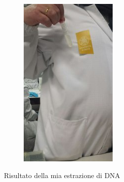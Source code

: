 \documentclass[twocolumn,a4paper,10pt]{my_report}
\begin{document}
\begin{figure}[htbp]
\begin{subfigure}{0.5\linewidth}
\includegraphics[width=0.8\linewidth]{4.jpg}
\label{fig:DNAunipv_b}
\end{subfigure}
\caption{Risultato della mia estrazione di DNA}
\label{fig:DNAunipv}
\end{figure}
\end{document}
